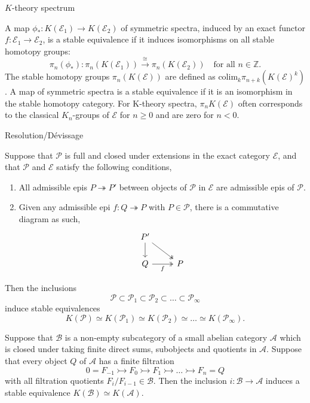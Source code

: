 \documentclass[10pt]{beamer}
\begin{document}
\begin{frame}{\( K \)-theory spectrum	}
		\begin{definition}
		A map $\phi_*: K(\mathcal{E}_1) \to K(\mathcal{E}_2)$ of symmetric spectra, induced by an exact functor $f: \mathcal{E}_1 \to \mathcal{E}_2$, is a {stable equivalence} if it induces isomorphisms on all stable homotopy groups:
		\[ \pi_n(\phi_*): \pi_n(K(\mathcal{E}_1)) \xrightarrow{\cong} \pi_n(K(\mathcal{E}_2)) \quad \text{for all } n \in \mathbb{Z}. \]
		The stable homotopy groups $\pi_n(K(\mathcal{E}))$ are defined as $\mathrm{colim}_k \pi_{n+k}(K(\mathcal{E})^k)$. A map of symmetric spectra is a stable equivalence if it is an isomorphism in the stable homotopy category. For K-theory spectra, $\pi_n K(\mathcal{E})$ often corresponds to the classical $K_n$-groups of $\mathcal{E}$ for $n \ge 0$ and are zero for $n < 0$.
	\end{definition}
\end{frame}
\begin{frame}{Resolution/D\'evissage}
		\begin{theorem}
		Suppose that $\mathcal{P}$ is full and closed under extensions in the exact category $\mathcal{E}$, and that $\mathcal{P}$ and $\mathcal{E}$ satisfy the following conditions,
			\end{theorem}
		\begin{enumerate}
			\item All admissible epis \( P \twoheadrightarrow P' \) between objects of \( \mathcal{P} \) in \( \mathcal{E} \) are admissible epis of \( \mathcal{P} \).
			\item Given any admissible epi \( f:Q \twoheadrightarrow P \) with \( P \in \mathcal{P} \), there is a commutative diagram as such,
			\[\begin{tikzcd}
				{P'} \\
				Q & P
				\arrow[from=1-1, to=2-1]
				\arrow[two heads, from=1-1, to=2-2]
				\arrow["f"', two heads, from=2-1, to=2-2]
			\end{tikzcd}\]
		\end{enumerate} Then the inclusions
		\[ \mathcal{P} \subset \mathcal{P}_1 \subset \mathcal{P}_2 \subset \dots \subset \mathcal{P}_\infty \]
		induce stable equivalences
		\[ K(\mathcal{P}) \simeq K(\mathcal{P}_1) \simeq K(\mathcal{P}_2) \simeq \dots \simeq K(\mathcal{P}_\infty). \]

	\pagebreak
	\begin{theorem}
		Suppose that $\mathcal{B}$ is a non-empty subcategory of a small abelian category $\mathcal{A}$ which is closed under taking finite direct sums, subobjects and quotients in $\mathcal{A}$. Suppose that every object $Q$ of $\mathcal{A}$ has a finite filtration
		\[ 0 = F_{-1} \rightarrowtail F_0 \rightarrowtail F_1 \rightarrowtail \dots \rightarrowtail F_n = Q \]
		with all filtration quotients $F_i/F_{i-1} \in \mathcal{B}$. Then the inclusion $i : \mathcal{B} \to \mathcal{A}$ induces a stable equivalence $K(\mathcal{B}) \simeq K(\mathcal{A})$.
	\end{theorem}
\end{frame}
\end{document}
